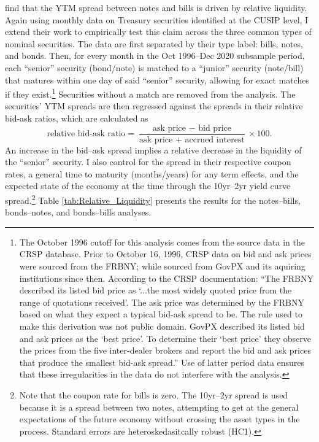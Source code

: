 \documentclass[11pt,a4paper,margin=1.5in]{article}
\begin{document}
\citet{Amihud-Mendelson:1991} find that the YTM spread between notes and bills is driven by relative liquidity.
Again using monthly data on Treasury securities identified at the CUSIP level, I extend their work to empirically test this claim across the three common types of nominal securities.
The data are first separated by their type label: bills, notes, and bonds.
Then, for every month in the Oct 1996--Dec 2020 subsample period, each ``senior'' security (bond/note) is matched to a ``junior'' security (note/bill) that matures within one day of said ``senior'' security, allowing for exact matches if they exist.\footnote{
	The October 1996 cutoff for this analysis comes from the source data in the CRSP database. 
	Prior to October 16, 1996, CRSP data on bid and ask prices were sourced from the FRBNY; while sourced from GovPX and its aquiring institutions since then.
	According to the CRSP documentation: ``The FRBNY described its listed bid price as `...the most widely quoted price from the range of quotations received'. 
	The ask price was determined by the FRBNY based on what they expect a typical bid-ask spread to be. 
	The rule used to make this derivation was not public domain.
	GovPX described its listed bid and ask prices as the `best price'. To determine their `best price' they observe the prices from the five inter-dealer brokers and report the bid and ask prices that produce the smallest bid-ask spread.''
	Use of latter period data ensures that these irregularities in the data do not interfere with the analysis.
}
Securities without a match are removed from the analysis.
The securities' YTM spreads are then regressed against the spreads in their relative bid-ask ratios, which are calculated as 
$$ \text{relative bid-ask ratio} = \frac{\text{ask price }-\text{ bid price}}{\text{ask price }+\text{ accrued interest}}\times 100.$$
An increase in the bid--ask spread implies a relative decrease in the liquidity of the ``senior'' security.
I also control for the spread in their respective coupon rates, a general time to maturity (months/years) for any term effects, and the expected state of the economy at the time through the 10yr--2yr yield curve spread.\footnote{
	Note that the coupon rate for bills is zero.
	The 10yr--2yr spread is used because it is a spread between two notes, attempting to get at the general expectations of the future economy without crossing the asset types in the process. 
	Standard errors are heteroskedasitcally robust (HC1).
}
Table \ref{tab:Relative_Liquidity} presents the results for the notes--bills, bonds--notes, and bonds--bills analyses.
\end{document}
